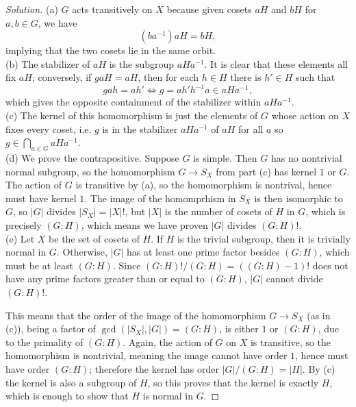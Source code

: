 \documentclass[10pt]{article}
\providecommand{\inv}{^{-1}}
\newenvironment{soln}{\begin{proof}[Solution]}{\end{proof}}
\providecommand{\abs}[1]{\left|#1\right|}
\begin{document}
\begin{soln}
    (a) $G$ acts transitively on $X$ because
    given cosets $aH$ and $bH$ for $a,b\in G$, we have
    \begin{equation*}
	(ba\inv)aH = bH,
    \end{equation*}
    implying that the two cosets lie in the same orbit.
    \\

    (b) The stabilizer of $aH$ is the subgroup $aHa\inv$.
    It is clear that these elements all fix $aH$;
    conversely, if $gaH = aH$, then for each $h\in H$
    there is $h'\in H$ such that
    \begin{equation*}
        gah = ah' \iff g = ah'h\inv a\in aHa\inv,
    \end{equation*}
    which gives the opposite containment of the stabilizer within $aHa\inv$.
    \\

    (c) The kernel of this homomorphism is just the elements of $G$
    whose action on $X$ fixes every coset, i.e. $g$ is in the stabilizer
    $aHa\inv$ of $aH$ for all $a$ so $g\in \bigcap_{a\in G}aHa\inv$.
    \\

    (d) We prove the contrapositive.
    Suppose $G$ is simple. Then $G$ has no nontrivial normal subgroup,
    so the homomorphism $G\to S_X$ from part (c) has kernel $1$ or $G$.
    The action of $G$ is transitive by (a),
    so the homomorphism is nontrival, hence must have kernel $1$.
    The image of the homomprhism in $S_X$ is then isomorphic to $G$,
    so $\abs G$ divides $\abs{S_X} = \abs X!$, but
    $\abs X$ is the number of cosets of $H$ in $G$, which is precisely $(G:H)$,
    which means we have proven $\abs G$ divides $(G:H)!$.
    \\

    (e) Let $X$ be the set of cosets of $H$.
    If $H$ is the trivial subgroup, then it is trivially normal in $G$.
    Otherwise, $\abs G$ has at least one prime factor besides $(G:H)$,
    which must be at least $(G:H)$. Since $(G:H)!/(G:H) = ((G:H)-1)!$
    does not have any prime factors greater than or equal to $(G:H)$,
    $\abs G$ cannot divide $(G:H)!$.

    This means that the order of
    the image of the homomorphism $G\to S_X$ (as in (c)),
    being a factor of $\gcd(\abs{S_X}, \abs G) = (G:H)$,
    is either $1$ or $(G:H)$, due to the primality of $(G:H)$.
    Again, the action of $G$ on $X$ is transitive,
    so the homomorphism is nontrivial, meaning
    the image cannot have order $1$, hence must have order $(G:H)$;
    therefore the kernel has order $\abs G/(G:H) = \abs H$.
    By (c) the kernel is also a subgroup of $H$,
    so this proves that the kernel is exactly $H$,
    which is enough to show that $H$ is normal in $G$.
\end{soln}
\end{document}
